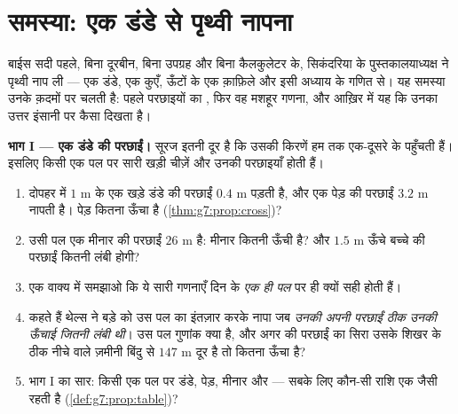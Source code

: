 \section{समस्या: एक डंडे से पृथ्वी नापना}

\begin{problem}
\label{pb:g7:prop:1}
बाईस सदी पहले, बिना दूरबीन, बिना उपग्रह और बिना कैलकुलेटर के,
सिकंदरिया के पुस्तकालयाध्यक्ष ने पृथ्वी नाप ली --- एक डंडे, एक
कुएँ, ऊँटों के एक क़ाफ़िले और इसी अध्याय के गणित से। यह समस्या उनके
क़दमों पर चलती है: पहले परछाइयों का , फिर वह मशहूर गणना, और
आख़िर में यह कि उनका उत्तर इंसानी  पर कैसा दिखता है।

\medskip
\noindent\textbf{भाग I --- एक डंडे की परछाईं।}
सूरज इतनी दूर है कि उसकी किरणें हम तक एक-दूसरे के  पहुँचती
हैं। इसलिए किसी एक पल पर सारी खड़ी चीज़ें और उनकी परछाइयाँ
 होती हैं।
\begin{enumerate}
  \item दोपहर में $1$ m के एक खड़े डंडे की परछाईं $0.4$ m पड़ती
        है, और एक पेड़ की परछाईं $3.2$ m नापती है। पेड़ कितना ऊँचा
        है (\cref{thm:g7:prop:cross})?
  \item उसी पल एक मीनार की परछाईं $26$ m है: मीनार कितनी ऊँची है?
        और $1.5$ m ऊँचे बच्चे की परछाईं कितनी लंबी होगी?
  \item एक वाक्य में समझाओ कि ये सारी गणनाएँ दिन के \emph{एक ही
        पल} पर ही क्यों सही होती हैं।
  \item कहते हैं थेल्स ने बड़े  को उस पल का इंतज़ार करके
        नापा जब \emph{उनकी अपनी परछाईं ठीक उनकी ऊँचाई जितनी लंबी
        थी}। उस पल  गुणांक क्या है, और अगर  की
        परछाईं का सिरा उसके शिखर के ठीक नीचे वाले ज़मीनी बिंदु से
        $147$ m दूर है तो  कितना ऊँचा है?
  \item भाग I का सार: किसी एक पल पर डंडे, पेड़, मीनार और 
        --- सबके लिए कौन-सी राशि एक जैसी रहती है
        (\cref{def:g7:prop:table})?
\end{enumerate}


\end{problem}
